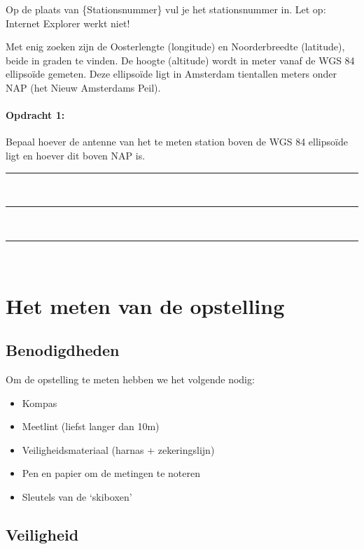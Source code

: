 Op de plaats van \{Stationsnummer\} vul je het stationsnummer in. Let
op: Internet Explorer werkt niet! 

Met enig zoeken zijn de Oosterlengte (longitude) en Noorderbreedte
(latitude), beide in graden te vinden. De hoogte (altitude) wordt in
meter vanaf de WGS 84 ellipsoïde gemeten. Deze ellipsoïde ligt in
Amsterdam tientallen meters onder NAP (het Nieuw Amsterdams Peil).

\begin{minipage}[t]{1\columnwidth}%

\paragraph{Opdracht 1:}

Bepaal hoever de \gps antenne van het te meten station boven
        de WGS 84 ellipsoïde ligt en hoever dit boven NAP is.

\begin{center}
    \rule{\textwidth}{0.3mm}\\
    \rule{\textwidth}{0.3mm}\\
    \rule{\textwidth}{0.3mm}\\
\end{center}
\end{minipage}


\section{Het meten van de opstelling}


\subsection{Benodigdheden}

Om de opstelling te meten hebben we het volgende nodig:

\begin{itemize}
    \item Kompas
    \item Meetlint (liefst langer dan 10m)
    \item Veiligheidsmateriaal (harnas + zekeringslijn)
    \item Pen en papier om de metingen te noteren
    \item Sleutels van de `skiboxen'
\end{itemize}

\subsection{Veiligheid}

